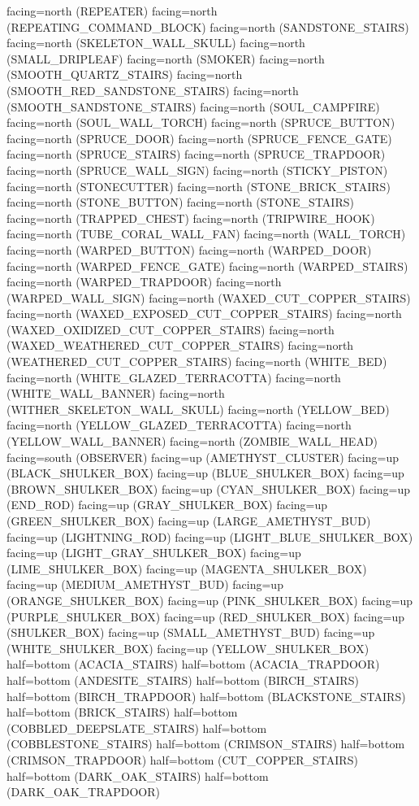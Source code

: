 \documentclass[11pt]{article}
\begin{document}
facing=north (REPEATER)
facing=north (REPEATING_COMMAND_BLOCK)
facing=north (SANDSTONE_STAIRS)
facing=north (SKELETON_WALL_SKULL)
facing=north (SMALL_DRIPLEAF)
facing=north (SMOKER)
facing=north (SMOOTH_QUARTZ_STAIRS)
facing=north (SMOOTH_RED_SANDSTONE_STAIRS)
facing=north (SMOOTH_SANDSTONE_STAIRS)
facing=north (SOUL_CAMPFIRE)
facing=north (SOUL_WALL_TORCH)
facing=north (SPRUCE_BUTTON)
facing=north (SPRUCE_DOOR)
facing=north (SPRUCE_FENCE_GATE)
facing=north (SPRUCE_STAIRS)
facing=north (SPRUCE_TRAPDOOR)
facing=north (SPRUCE_WALL_SIGN)
facing=north (STICKY_PISTON)
facing=north (STONECUTTER)
facing=north (STONE_BRICK_STAIRS)
facing=north (STONE_BUTTON)
facing=north (STONE_STAIRS)
facing=north (TRAPPED_CHEST)
facing=north (TRIPWIRE_HOOK)
facing=north (TUBE_CORAL_WALL_FAN)
facing=north (WALL_TORCH)
facing=north (WARPED_BUTTON)
facing=north (WARPED_DOOR)
facing=north (WARPED_FENCE_GATE)
facing=north (WARPED_STAIRS)
facing=north (WARPED_TRAPDOOR)
facing=north (WARPED_WALL_SIGN)
facing=north (WAXED_CUT_COPPER_STAIRS)
facing=north (WAXED_EXPOSED_CUT_COPPER_STAIRS)
facing=north (WAXED_OXIDIZED_CUT_COPPER_STAIRS)
facing=north (WAXED_WEATHERED_CUT_COPPER_STAIRS)
facing=north (WEATHERED_CUT_COPPER_STAIRS)
facing=north (WHITE_BED)
facing=north (WHITE_GLAZED_TERRACOTTA)
facing=north (WHITE_WALL_BANNER)
facing=north (WITHER_SKELETON_WALL_SKULL)
facing=north (YELLOW_BED)
facing=north (YELLOW_GLAZED_TERRACOTTA)
facing=north (YELLOW_WALL_BANNER)
facing=north (ZOMBIE_WALL_HEAD)
facing=south (OBSERVER)
facing=up (AMETHYST_CLUSTER)
facing=up (BLACK_SHULKER_BOX)
facing=up (BLUE_SHULKER_BOX)
facing=up (BROWN_SHULKER_BOX)
facing=up (CYAN_SHULKER_BOX)
facing=up (END_ROD)
facing=up (GRAY_SHULKER_BOX)
facing=up (GREEN_SHULKER_BOX)
facing=up (LARGE_AMETHYST_BUD)
facing=up (LIGHTNING_ROD)
facing=up (LIGHT_BLUE_SHULKER_BOX)
facing=up (LIGHT_GRAY_SHULKER_BOX)
facing=up (LIME_SHULKER_BOX)
facing=up (MAGENTA_SHULKER_BOX)
facing=up (MEDIUM_AMETHYST_BUD)
facing=up (ORANGE_SHULKER_BOX)
facing=up (PINK_SHULKER_BOX)
facing=up (PURPLE_SHULKER_BOX)
facing=up (RED_SHULKER_BOX)
facing=up (SHULKER_BOX)
facing=up (SMALL_AMETHYST_BUD)
facing=up (WHITE_SHULKER_BOX)
facing=up (YELLOW_SHULKER_BOX)
half=bottom (ACACIA_STAIRS)
half=bottom (ACACIA_TRAPDOOR)
half=bottom (ANDESITE_STAIRS)
half=bottom (BIRCH_STAIRS)
half=bottom (BIRCH_TRAPDOOR)
half=bottom (BLACKSTONE_STAIRS)
half=bottom (BRICK_STAIRS)
half=bottom (COBBLED_DEEPSLATE_STAIRS)
half=bottom (COBBLESTONE_STAIRS)
half=bottom (CRIMSON_STAIRS)
half=bottom (CRIMSON_TRAPDOOR)
half=bottom (CUT_COPPER_STAIRS)
half=bottom (DARK_OAK_STAIRS)
half=bottom (DARK_OAK_TRAPDOOR)
\end{document}
